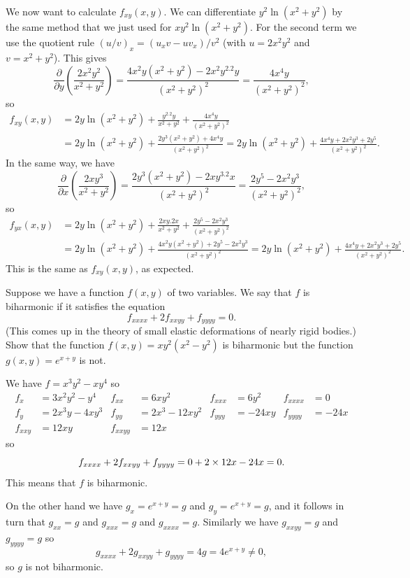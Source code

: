 \documentclass[a4paper]{amsart}
\renewenvironment{solution}{\SolutionInline}{\endSolutionInline}
\begin{document}
\begin{solution}
\begin{itemize}
   We now want to calculate $f_{xy}(x,y)$.  We can differentiate
   $y^2\ln(x^2+y^2)$ by the same method that we just used for
   $xy^2\ln(x^2+y^2)$.  For the second term we use the quotient rule
   $(u/v)_x=(u_xv-uv_x)/v^2$ (with $u=2x^2y^2$ and $v=x^2+y^2$).  This
   gives 
   \[ \frac{\partial}{\partial y}\left(\frac{2x^2y^2}{x^2+y^2}\right)
       = \frac{4x^2y(x^2+y^2)-2x^2y^2.2y}{(x^2+y^2)^2}
       = \frac{4x^4y}{(x^2+y^2)^2},
   \]
   so 
   \begin{align*}
    f_{xy}(x,y) &= 2y\ln(x^2+y^2) + \frac{y^2.2y}{x^2+y^2} + 
                     \frac{4x^4y}{(x^2+y^2)^2} \\
     &= 2y\ln(x^2+y^2) + \frac{2y^3(x^2+y^2)+4x^4y}{(x^2+y^2)^2} 
      = 2y\ln(x^2+y^2) + \frac{4x^4y + 2x^2y^3 + 2y^5}{(x^2+y^2)^2}. 
   \end{align*}
   In the same way, we have
   \[ \frac{\partial}{\partial x}\left(\frac{2xy^3}{x^2+y^2}\right)
       = \frac{2y^3(x^2+y^2)-2xy^3.2x}{(x^2+y^2)^2}
       = \frac{2y^5-2x^2y^3}{(x^2+y^2)^2},
   \]
   so 
   \begin{align*}
    f_{yx}(x,y) &= 2y\ln(x^2+y^2) + \frac{2xy.2x}{x^2+y^2} +
                    \frac{2y^5-2x^2y^3}{(x^2+y^2)^2} \\
     &= 2y\ln(x^2+y^2) + \frac{4x^2y(x^2+y^2)+2y^5-2x^2y^3}{(x^2+y^2)^2}
      = 2y\ln(x^2+y^2) + \frac{4x^4y + 2x^2y^3 + 2y^5}{(x^2+y^2)^2}.
   \end{align*}
   This is the same as $f_{xy}(x,y)$, as expected.
 \end{itemize}
\end{solution}

\begin{exercise}
 Suppose we have a function $f(x,y)$ of two variables.  We say that
 $f$ is biharmonic if it satisfies the equation
 \[ f_{xxxx} + 2 f_{xxyy} + f_{yyyy} = 0. \]
 (This comes up in the theory of small elastic deformations of nearly
 rigid bodies.) Show that the function $f(x,y)=xy^2(x^2-y^2)$ is
 biharmonic but the function $g(x,y)=e^{x+y}$ is not.
\end{exercise}
\begin{solution}
 We have $f=x^3y^2-xy^4$ so
 \begin{align*}
  f_x &= 3x^2y^2 - y^4 &
  f_{xx} &= 6xy^2 & 
  f_{xxx} &= 6y^2 & 
  f_{xxxx} &= 0 \\
  f_y &= 2x^3y - 4xy^3 &
  f_{yy} &= 2x^3-12xy^2 & 
  f_{yyy} &= -24xy & 
  f_{yyyy} &= -24x \\
  f_{xxy} &= 12xy & 
  f_{xxyy} &= 12x
 \end{align*}
 so 
 \[ f_{xxxx} + 2 f_{xxyy} + f_{yyyy} = 0 + 2\times 12x - 24x = 0. \]
 This means that $f$ is biharmonic.

 On the other hand we have $g_x=e^{x+y}=g$ and $g_y=e^{x+y}=g$, and it
 follows in turn that $g_{xx}=g$ and $g_{xxx}=g$ and $g_{xxxx}=g$.
 Similarly we have $g_{xxyy}=g$ and $g_{yyyy}=g$ so 
 \[ g_{xxxx} + 2 g_{xxyy} + g_{yyyy} = 4g = 4e^{x+y} \neq 0, \]
 so $g$ is not biharmonic.
\end{solution}
\end{document}
